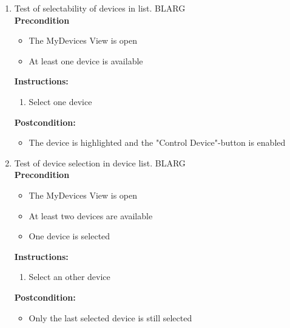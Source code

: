 \documentclass[a4paper]{article}
\newlength{\testlabellength}
\newenvironment{testlist}{\begin{enumerate}[label=\bfseries Instruction \thesubsection.\arabic* , labelindent=0pt, labelwidth=\testlabellength , leftmargin=2cm]}{\end{enumerate}}
\newenvironment{precondition}{
{\color{white}BLARG}\\ 
\textbf{Precondition}
\begin{itemize}[labelindent=0cm, labelwidth=2cm , leftmargin=1cm]
}
{\end{itemize}}
\newenvironment{instruction}{
\textbf{Instructions:}
\begin{enumerate}[label=\bfseries  \arabic*., labelindent=0cm, labelwidth=2cm , leftmargin=1cm]
}
{\end{enumerate}}
\newenvironment{postcondition}{
\textbf{Postcondition:}
\begin{itemize}[labelindent=0cm, labelwidth=2cm , leftmargin=1cm]
}
{\end{itemize}}
\begin{document}
\begin{appendices}
\begin{testlist}
    	\begin{instruction}
			\item Verify that the devices are in a list
		\end{instruction}
		\begin{postcondition}
			\item The devices are in a list
		\end{postcondition}
   \newpage
    \item Test of selectability of devices in list.
     	\begin{precondition}
    		\item The MyDevices View is open
    		\item At least one device is available
    	\end{precondition}
		\begin{instruction}
			\item Select one device
		\end{instruction}
		\begin{postcondition}
			\item The device is highlighted and the "Control Device"-button is enabled
		\end{postcondition}
   
    \item Test of device selection in device list.
   		\begin{precondition}
   			\item The MyDevices View is open
   			\item At least two devices are available
   			\item One device is selected
   		\end{precondition}
   		\begin{instruction}
   			\item Select an other device
   		\end{instruction}
   		\begin{postcondition}
   			\item Only the last selected device is still selected
   		\end{postcondition}
    

\end{testlist}
\end{appendices}
\end{document}
